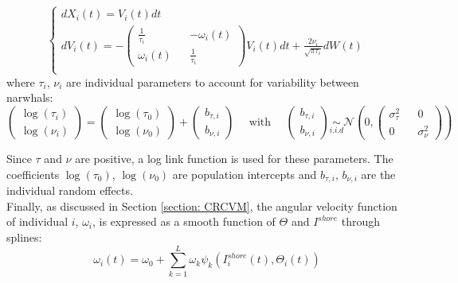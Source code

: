 \documentclass[aoas]{imsart}
\theoremstyle{definition}
\theoremstyle{remark}
\theoremstyle{remark}
\newcommand {\1}{\mathbb{1}}
\begin{document}
\begin{equation}  %
	\left\{
	\begin{array}{l}
		dX_i(t)=V_i(t)dt  \\
		dV_i(t)=-\begin{pmatrix} 
			\frac{1}{\tau_i} && -\omega_i(t) \\
			\omega_i(t) && \frac{1}{\tau_i}
		\end{pmatrix}V_i(t)dt+\frac{2\nu_i}{\sqrt{\pi \tau_i}} dW(t) \\
	\end{array}
	\right.
	\label{eq:baseline latent processes}
\end{equation}
%
where $\tau_i$, $\nu_i$ are individual parameters   to account for variability between narwhals:
%
\begin{equation}   
	\begin{pmatrix}	\log(\tau_i)\\ \log(\nu_i) \end{pmatrix}
	= \begin{pmatrix}\log(\tau_0)\\ \log(\nu_0) \end{pmatrix}
	+
	\begin{pmatrix} b_{\tau,i}\\  b_{\nu,i}  \end{pmatrix}
	\quad \mbox{ with } \quad
	\begin{pmatrix} b_{\tau,i} \\ b_{\nu,i} \end{pmatrix} \underset{i.i.d}{\sim} \mathcal{N}\left(0,\begin{pmatrix} \sigma_{\tau}^2 && 0 \\ 0 && \sigma_{\nu}^2 \end{pmatrix}\right) 
	\label{eq:baseline random effects}
\end{equation}

Since $\tau$ and $\nu$ are positive, a log link function is used for these parameters. The coefficients $\log(\tau_{0})$, $\log(\nu_{0})$ are population intercepts and $b_{\tau,i}$, $b_{\nu,i}$
are the individual random effects. \\

Finally, as discussed in Section \ref{section: CRCVM}, the angular velocity function of individual $i$, $\omega_i$, is expressed as a smooth function of $\Theta$ and $I^{shore}$ through splines: 
%
\begin{equation} 
	\omega_i(t)=\omega_{0}+\sum_{k=1}^{L} \omega_{k} \psi_k(I_i^{shore}(t),\Theta_i(t))
	\label{eq: baseline splines}
\end{equation}
\end{document}
